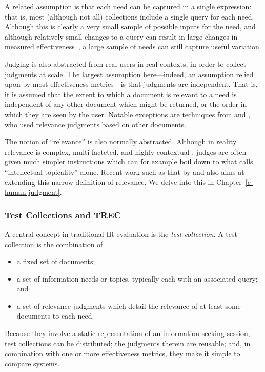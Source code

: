A related assumption is that each need can be captured in a single expression: that is, most (although not all) collections include a single query for each need.  Although this is clearly a very small sample of possible inputs for the need, and although relatively small changes to a query can result in large changes in measured effectiveness~\citep{bailey15user}, a large sample of needs can still capture useful variation.

Judging is also abstracted from real users in real contexts, in order to collect judgments at scale. The largest assumption here---indeed, an assumption relied upon by most effectiveness metrics---is that judgments are independent. That is, it is assumed that the extent to which a document is relevant to a need is independent of any other document which might be returned, or the order in which they are seen by the user. Notable exceptions are techniques from \cite{Golbus:2014} and \cite{CDR,Chandar2013}, who used relevance judgments based on other documents.

The notion of ``relevance'' is also normally abstracted. Although in reality relevance is complex, multi-facteted, and highly contextual \citep{borlund2003,saracevic16relevance}, judges are often given much simpler instructions which can for example boil down to what \cite{borlund2003} calls ``intellectual topicality'' alone. Recent work such as that by \cite{Mao:2016} and \cite{VermaYC16} also aims at extending this narrow definition of relevance. We delve into this in Chapter~\ref{c-human-judgment}.

\subsubsection{Test Collections and TREC}

A central concept in traditional IR evaluation is the \emph{test collection}. A test collection is the combination of 

\begin{itemize}
	\item a fixed set of documents; 
	\item a set of information needs or topics, typically each with an associated query; and 
	\item a set of relevance judgments which detail the relevance of at least some documents to each need.
\end{itemize}

Because they involve a static representation of an information-seeking session, test collections can be distributed; the judgments therein are reusable; and, in combination with one or more effectiveness metrics, they make it simple to compare systems.

